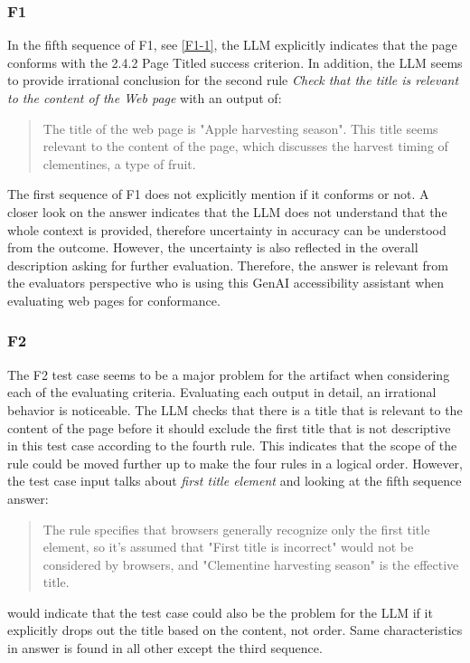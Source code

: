 \subsubsection{F1}

In the fifth sequence of F1, see \ref{F1-1}, the LLM explicitly indicates that the page conforms with the 2.4.2 Page Titled success criterion. In addition, the LLM seems to provide irrational conclusion for the second rule \textit{Check that the title is relevant to the content of the Web page} with an output of:

\begin{quote}
    The title of the web page is "Apple harvesting season". This title seems relevant to the content of the page, which discusses the harvest timing of clementines, a type of fruit.
\end{quote}

The first sequence of F1 does not explicitly mention if it conforms or not. A closer look on the answer indicates that the LLM does not understand that the whole context is provided, therefore uncertainty in accuracy can be understood from the outcome. However, the uncertainty is also reflected in the overall description asking for further evaluation. Therefore, the answer is relevant from the evaluators perspective who is using this GenAI accessibility assistant when evaluating web pages for conformance.

\subsubsection{F2}

The F2 test case seems to be a major problem for the artifact when considering each of the evaluating criteria. Evaluating each output in detail, an irrational behavior is noticeable. The LLM checks that there is a title that is relevant to the content of the page before it should exclude the first title that is not descriptive in this test case according to the fourth rule. This indicates that the scope of the rule could be moved further up to make the four rules in a logical order. However, the test case input talks about \textit{first title element} and looking at the fifth sequence answer: \blockquote{The rule specifies that browsers generally recognize only the first title element, so it's assumed that "First title is incorrect" would not be considered by browsers, and "Clementine harvesting season" is the effective title.} would indicate that the test case could also be the problem for the LLM if it explicitly drops out the title based on the content, not order. Same characteristics in answer is found in all other except the third sequence.

